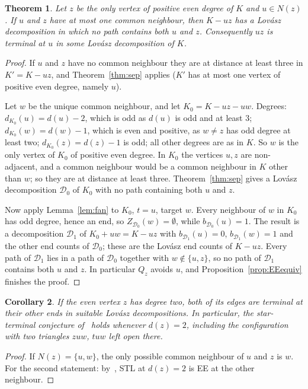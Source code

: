 \documentclass[11pt]{amsart}
\newtheorem{theorem}{Theorem}[section]
\newtheorem{corollary}[theorem]{Corollary}
\theoremstyle{definition}
\newcommand{\cD}{\mathcal D}
\begin{document}
\begin{theorem}\label{thm:common}
Let $z$ be the only vertex of positive even degree of $K$ and $u\in N(z)$. If $u$ and $z$ have at
most one common neighbour, then $K-uz$ has a Lov\'asz decomposition in which no path contains both
$u$ and $z$. Consequently $uz$ is terminal at $u$ in some Lov\'asz decomposition of $K$.
\end{theorem}

\begin{proof}
If $u$ and $z$ have no common neighbour they are at distance at least three in $K'=K-uz$, and
Theorem~\ref{thm:sep} applies ($K'$ has at most one vertex of positive even degree, namely $u$).

Let $w$ be the unique common neighbour, and let $K_0=K-uz-uw$. Degrees: $d_{K_0}(u)=d(u)-2$, which is
odd as $d(u)$ is odd and at least $3$; $d_{K_0}(w)=d(w)-1$, which is even and positive, as $w\ne z$
has odd degree at least two; $d_{K_0}(z)=d(z)-1$ is odd; all other degrees are as in $K$. So $w$ is the
only vertex of $K_0$ of positive even degree. In $K_0$ the vertices $u,z$ are non-adjacent, and a
common neighbour would be a common neighbour in $K$ other than $w$; so they are at distance at least
three. Theorem~\ref{thm:sep} gives a Lov\'asz decomposition $\cD_0$ of $K_0$ with no path containing
both $u$ and $z$.

Now apply Lemma~\ref{lem:fan} to $K_0$, $t=u$, target $w$. Every neighbour of $w$ in $K_0$ has odd
degree, hence an end, so $Z_{\cD_0}(w)=\emptyset$, while $b_{\cD_0}(u)=1$. The result is a
decomposition $\cD_1$ of $K_0+uw=K-uz$ with $b_{\cD_1}(u)=0$, $b_{\cD_1}(w)=1$ and the other end counts
of $\cD_0$; these are the Lov\'asz end counts of $K-uz$. Every path of $\cD_1$ lies in a path of
$\cD_0$ together with $w\notin\{u,z\}$, so no path of $\cD_1$ contains both $u$ and $z$. In particular
$Q_z$ avoids $u$, and Proposition~\ref{prop:EEequiv} finishes the proof.
\end{proof}

\begin{corollary}\label{cor:deg2}
If the even vertex $z$ has degree two, both of its edges are terminal at their other ends in suitable
Lov\'asz decompositions. In particular, the star-terminal conjecture of~\cite{STL} holds whenever
$d(z)=2$, including the configuration with two triangles $zuw$, $tuw$ left open there.
\end{corollary}

\begin{proof}
If $N(z)=\{u,w\}$, the only possible common neighbour of $u$ and $z$ is $w$. For the second
statement: by~\cite[Proposition~4.3]{STL}, STL at $d(z)=2$ is EE at the other neighbour.
\end{proof}
\end{document}
